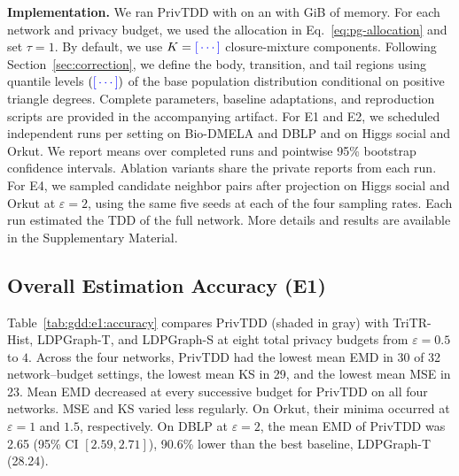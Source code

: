 \noindent\textbf{Implementation.}
We ran PrivTDD with  on an  with  GiB of memory.
For each network and privacy budget, we used the allocation in Eq.~\eqref{eq:pg-allocation} and set $\tau=1$.
By default, we use $K=\gddresult{settings.closure_components}$ closure-mixture components.
Following Section~\ref{sec:correction}, we define the body, transition, and tail regions using quantile levels $(\gddresult{settings.region_quantiles})$ of the base population distribution conditional on positive triangle degrees.
Complete parameters, baseline adaptations, and reproduction scripts are provided in the accompanying artifact.
For E1 and E2, we scheduled  independent runs per setting on Bio-DMELA and DBLP and  on Higgs social and Orkut. We report means over completed runs and pointwise 95\% bootstrap confidence intervals.
Ablation variants share the private reports from each run.
For E4, we sampled candidate neighbor pairs after projection on Higgs social and Orkut at $\varepsilon=2$, using the same five seeds at each of the four sampling rates. Each run estimated the TDD of the full network.
More details and results are available in the Supplementary Material. %

\subsection{Overall Estimation Accuracy (E1)}\label{sec:gdd:en:accuracy}
Table~\ref{tab:gdd:e1:accuracy} compares PrivTDD (shaded in gray) with TriTR-Hist, LDPGraph-T, and LDPGraph-S at eight total privacy budgets from $\varepsilon=0.5$ to $4$. %
Across the four networks, PrivTDD had the lowest mean EMD in 30 of 32 network--budget settings, the lowest mean KS in 29, and the lowest mean MSE in 23.
Mean EMD decreased at every successive budget for PrivTDD on all four networks. MSE and KS varied less regularly. On Orkut, their minima occurred at $\varepsilon=1$ and $1.5$, respectively.
On DBLP at $\varepsilon=2$, the mean EMD of PrivTDD was 2.65 (95\% CI $[2.59,2.71]$), 90.6\% lower than the best baseline, LDPGraph-T (28.24).

